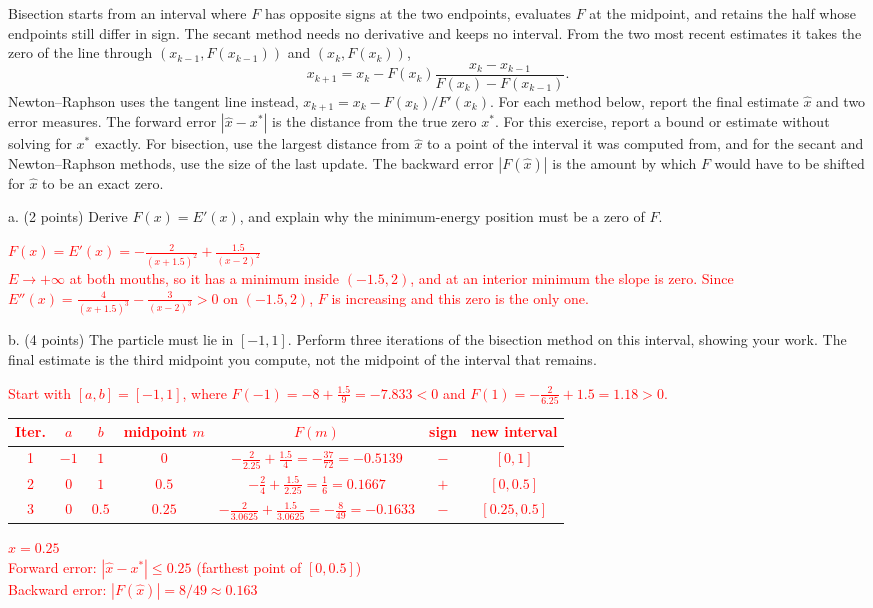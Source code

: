 \documentclass[11pt]{article}
\begin{document}
Bisection starts from an interval where $F$ has opposite signs at the two endpoints, evaluates
$F$ at the midpoint, and retains the half whose endpoints still differ in sign. The secant
method needs no derivative and keeps no interval.
From the two most recent estimates it takes the zero of the line through
$(x_{k-1},F(x_{k-1}))$ and $(x_k,F(x_k))$,
\[
x_{k+1}=x_k-F(x_k)\frac{x_k-x_{k-1}}{F(x_k)-F(x_{k-1})}.
\]
Newton--Raphson uses the tangent line instead, $x_{k+1}=x_k-F(x_k)/F'(x_k)$. For each method
below, report the final estimate $\hat x$ and two error measures. The forward error
$|\hat x-x^*|$ is the distance from the true zero $x^*$. For this exercise, report a bound or estimate without solving for $x^*$ exactly. For
bisection, use the largest distance from $\hat x$ to a point of the interval it was computed
from, and for the secant and Newton--Raphson methods, use the size of the last update. The backward error $|F(\hat x)|$ is
the amount by which $F$ would have to be shifted for $\hat x$ to be an exact zero.

a. (2 points) Derive $F(x)=E'(x)$, and explain why the minimum-energy position must be a zero
of $F$.

\textcolor{red}{
$F(x) = E'(x) = -\frac{2}{(x+1.5)^2} + \frac{1.5}{(x-2)^2}$\\
$E \to +\infty$ at both mouths, so it has a minimum inside $(-1.5, 2)$, and at an interior minimum the slope is zero. Since $E''(x) = \frac{4}{(x+1.5)^3} - \frac{3}{(x-2)^3} > 0$ on $(-1.5, 2)$, $F$ is increasing and this zero is the only one.
}

b. (4 points) The particle must lie in $[-1,1]$. Perform three iterations of the bisection
method on this interval, showing your work. The final estimate is the third midpoint you
compute, not the midpoint of the interval that remains.

\textcolor{red}{
Start with $[a, b] = [-1, 1]$, where $F(-1) = -8 + \tfrac{1.5}{9} = -7.833 < 0$ and $F(1) = -\tfrac{2}{6.25} + 1.5 = 1.18 > 0$.
\begin{center}
\begin{tabular}{ccccccc}
Iter. & $a$ & $b$ & midpoint $m$ & $F(m)$ & sign & new interval \\ \hline
1 & $-1$ & $1$ & $0$ & $-\tfrac{2}{2.25} + \tfrac{1.5}{4} = -\tfrac{37}{72} = -0.5139$ & $-$ & $[0, 1]$ \\
2 & $0$ & $1$ & $0.5$ & $-\tfrac{2}{4} + \tfrac{1.5}{2.25} = \tfrac{1}{6} = 0.1667$ & $+$ & $[0, 0.5]$ \\
3 & $0$ & $0.5$ & $0.25$ & $-\tfrac{2}{3.0625} + \tfrac{1.5}{3.0625} = -\tfrac{8}{49} = -0.1633$ & $-$ & $[0.25, 0.5]$
\end{tabular}
\end{center}
$\hat x = 0.25$\\
Forward error: $|\hat x - x^*| \le 0.25$ (farthest point of $[0, 0.5]$)\\
Backward error: $|F(\hat x)| = 8/49 \approx 0.163$
}
\end{document}

